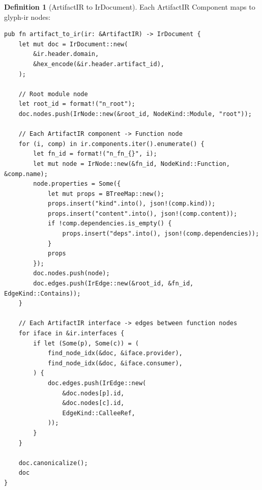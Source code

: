 \documentclass[11pt,a4paper,twoside]{article}
\theoremstyle{definition}
\newtheorem{definition}{Definition}[section]
\theoremstyle{plain}
\theoremstyle{remark}
\begin{document}
\begin{definition}[ArtifactIR to IrDocument]\label{def:convert}
Each ArtifactIR Component maps to glyph-ir nodes:
\begin{lstlisting}
pub fn artifact_to_ir(ir: &ArtifactIR) -> IrDocument {
    let mut doc = IrDocument::new(
        &ir.header.domain,
        &hex_encode(&ir.header.artifact_id),
    );

    // Root module node
    let root_id = format!("n_root");
    doc.nodes.push(IrNode::new(&root_id, NodeKind::Module, "root"));

    // Each ArtifactIR component -> Function node
    for (i, comp) in ir.components.iter().enumerate() {
        let fn_id = format!("n_fn_{}", i);
        let mut node = IrNode::new(&fn_id, NodeKind::Function, &comp.name);
        node.properties = Some({
            let mut props = BTreeMap::new();
            props.insert("kind".into(), json!(comp.kind));
            props.insert("content".into(), json!(comp.content));
            if !comp.dependencies.is_empty() {
                props.insert("deps".into(), json!(comp.dependencies));
            }
            props
        });
        doc.nodes.push(node);
        doc.edges.push(IrEdge::new(&root_id, &fn_id, EdgeKind::Contains));
    }

    // Each ArtifactIR interface -> edges between function nodes
    for iface in &ir.interfaces {
        if let (Some(p), Some(c)) = (
            find_node_idx(&doc, &iface.provider),
            find_node_idx(&doc, &iface.consumer),
        ) {
            doc.edges.push(IrEdge::new(
                &doc.nodes[p].id,
                &doc.nodes[c].id,
                EdgeKind::CalleeRef,
            ));
        }
    }

    doc.canonicalize();
    doc
}
\end{lstlisting}
\end{definition}
\end{document}
